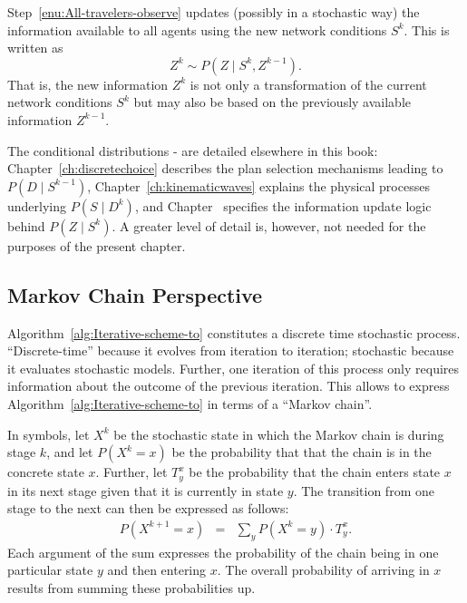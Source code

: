 Step~\ref{enu:All-travelers-observe} updates (possibly in a stochastic
way) the information available to all agents using the new network
conditions $S^{k}$. This is written as
\begin{equation}
Z^{k}\sim P(Z\mid S^{k},Z^{k-1}).\label{eq:learning-model}
\end{equation}
That is, the new information $Z^{k}$ is not only a transformation
of the current network conditions $S^{k}$ but may also be based on
the previously available information $Z^{k-1}$.

The conditional distributions -
are detailed elsewhere in this book: Chapter~\ref{ch:discretechoice} 
describes the plan selection mechanisms leading to $P(D\mid S^{k-1})$,
Chapter~\ref{ch:kinematicwaves} explains the physical processes underlying
$P(S\mid D^{k})$, and Chapter~ specifies the information
update logic behind $P(Z\mid S^{k})$. A greater level of detail is,
however, not needed for the purposes of the present chapter.


\subsection{\label{sub:Markov-chain-perspective}Markov Chain Perspective}

Algorithm~\ref{alg:Iterative-scheme-to} constitutes a discrete time
stochastic process. {}``Discrete-time'' because it evolves from
iteration to iteration; stochastic because it evaluates stochastic
models. Further, one iteration of this process only requires information
about the outcome of the previous iteration. This allows to express
Algorithm~\ref{alg:Iterative-scheme-to} in terms of a {}``Markov
chain''. 

In symbols, let $X^{k}$ be the stochastic state in which the Markov
chain is during stage $k$, and let $P(X^{k}=x)$ be the probability
that that the chain is in the concrete state $x$. Further, let $T_{y}^{x}$
be the probability that the chain enters state $x$ in its next stage
given that it is currently in state $y$. The transition from one
stage to the next can then be expressed as follows:
\begin{eqnarray}
P(X^{k+1}=x) & = & \sum_{y}P(X^{k}=y)\cdot T_{y}^{x}.\label{eq:one-mc-transition}
\end{eqnarray}
Each argument of the sum expresses the probability of the chain being
in one particular state $y$ and then entering $x$. The overall probability
of arriving in $x$ results from summing these probabilities up.

